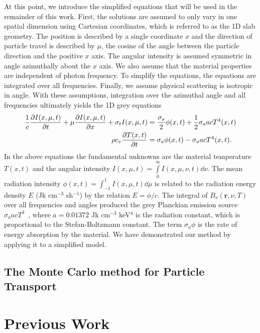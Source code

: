 At this point, we introduce the simplified equations that will be used in the remainder of
this work.  First, the solutions are assumed to only vary in one spatial dimension using
Cartesian coordinates, which is referred to as the 1D slab geometry.   The
position is described by a single coordinate $x$ and the direction of particle travel
is described by $\mu$, the cosine of the angle between the particle direction and the
positive $x$ axis. The angular
intensity is assumed symmetric in angle azimuthally about the $x$ axis.  
We also assume that the material properties are independent of photon frequency. To
simplify the equations, the equations are integrated over all frequencies.    Finally, we assume physical scattering
is isotropic in angle. With these assumptions, integration over the azimuthal angle and
all frequencies ultimately yields the 1D grey equations~\cite{wollaber_thesis,mihalas}
\begin{align}\label{eq:rad_cont}
    \frac{1}{c}\frac{\partial I(x,\mu,t)}{\partial t} + \mu \frac{\partial I(x,\mu,t)}{\partial x} + \sigma_t
    I(x,\mu,t)
&= \frac{\sigma_s}{2} \phi(x,t) +\frac{1}{2} \sigma_a a c T^4(x,t)
    \\ \label{eq:mat_cont}
  \rho c_v \frac{\partial T(x,t)}{\partial t} &=  \sigma_a \phi(x,t) - \sigma_a a c T^4(x,t).
\end{align}
In the above equations the fundamental unknowns are the material temperature $T(x,t)$ and
the angular intensity $I(x,\mu,t)=\int\limits_0^\infty I(x,\mu,\nu,t) \dd \nu$. The mean radiation intensity $\phi(x,t)=\int_{-1}^1
I(x,\mu,t) \dd \mu$ is related to the radiation energy density
$E$ (Jk cm$^{-3}$ sh$^{-1}$) by the relation $E = \phi/c$.  The integral of
$B_\nu(\mathbf{r},\nu,T)$ over all frequencies and angles produced the 
grey Planckian emission source $\sigma_a a c T^4$~\cite{mihalas}, where $a=0.01372$ Jk cm$^{-3}$
keV$^{4}$ is the radiation constant, which is proportional to the Stefan-Boltzmann
constant.  The term $\sigma_a \phi$ is the rate of energy absorption by the material.
   We have demonstrated our method by applying it to a
simplified model.  

\subsection{The Monte Carlo method for Particle Transport}

\section{Previous Work}

